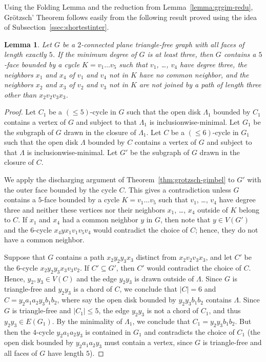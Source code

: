 \documentclass[12pt,twoside,openright,a4paper]{book}
\newtheorem{lemma}[theorem]{Lemma}
\begin{document}
Using the Folding Lemma and the reduction from Lemma~\ref{lemma:grgim-redu}, Gr\"otzsch' Theorem follows easily
from the following result proved using the idea of Subsection~\ref{ssec:shortestinter}.
\begin{lemma}\label{lemma:exredu}
Let $G$ be a $2$-connected plane triangle-free graph with all faces of length exactly $5$.
If the minimum degree of $G$ is at least three, then $G$ contains a $5$-face bounded by a cycle $K=v_1\ldots v_5$
such that $v_1$, \ldots, $v_4$ have degree three, the neighbors $x_1$ and $x_4$ of $v_1$ and $v_4$
not in $K$ have no common neighbor, and the neighbors $x_2$ and $x_3$ of $v_2$ and $v_3$ not in $K$
are not joined by a path of length three other than $x_2v_2v_3x_3$.
\end{lemma}
\begin{proof}
Let $C_1$ be a $(\le\!5)$-cycle in $G$ such that the open disk $\Lambda_1$ bounded by $C_1$ contains a vertex
of $G$ and subject to that $\Lambda_1$ is inclusionwise-minimal.  Let $G_1$ be the subgraph of $G$ drawn in
the closure of $\Lambda_1$.  Let $C$ be a $(\le\!6)$-cycle in $G_1$ such that the open disk $\Lambda$ bounded by $C$ contains a vertex
of $G$ and subject to that $\Lambda$ is inclusionwise-minimal.  Let $G'$ be the subgraph of $G$ drawn in the closure
of $C$.

We apply the discharging argument of Theorem~\ref{thm:grotzsch-gimbel} to $G'$ with the outer face bounded by the cycle $C$.
This gives a contradiction unless $G$ contains a $5$-face bounded by a cycle $K=v_1\ldots v_5$
such that $v_1$, \ldots, $v_4$ have degree three and neither these vertices nor their neighbors $x_1$, \ldots, $x_4$ outside of $K$
belong to $C$.  If $x_1$ and $x_4$ had a common neighbor $y$ in $G$, then note that $y\in V(G')$ and the $6$-cycle $x_4yx_1v_1v_5v_4$
would contradict the choice of $C$; hence, they do not have a common neighbor.

Suppose that $G$ contains a path $x_2y_2y_3x_3$ distinct from $x_2v_2v_3x_3$, and let $C'$ be the $6$-cycle $x_2y_2y_3x_3v_3v_2$.
If $C'\subseteq G'$, then $C'$ would contradict the choice of $C$.  Hence, $y_2,y_3\in V(C)$ and the edge $y_2y_3$ is drawn outside of $\Lambda$.
Since $G$ is triangle-free and $y_2y_3$ is a chord of $C$, we conclude that $|C|=6$ and $C=y_2a_1a_2y_3b_1b_2$, where say the open disk
bounded by $y_2y_3b_1b_2$ contains $\Lambda$.  Since $G$ is triangle-free and $|C_1|\le 5$, the edge $y_2y_3$ is not a chord of $C_1$,
and thus $y_2y_3\in E(G_1)$.  By the minimality of $\Lambda_1$, we conclude that $C_1=y_2y_3b_1b_2$.  But then the $4$-cycle $y_2a_1a_2y_3$
is contained in $G_1$ and contradicts the choice of $C_1$ (the open disk bounded by $y_2a_1a_2y_3$ must contain a vertex, since
$G$ is triangle-free and all faces of $G$ have length $5$).
\end{proof}
\end{document}
